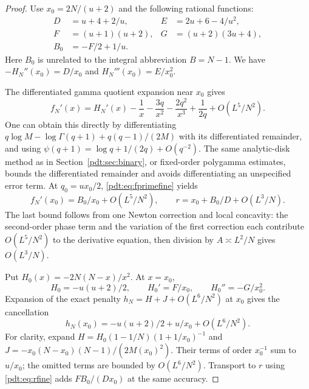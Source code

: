 \begin{proof}
Use $x_0=2N/(u+2)$ and the following rational functions:
\begin{equation}\label{pdt:eq:algebra-abbr}
 \begin{aligned}
 D&=u+4+2/u,& E&=2u+6-4/u^2,\\
 F&=(u+1)(u+2),& G&=(u+2)(3u+4),\\
 B_0&=-F/2+1/u.&
 \end{aligned}
\end{equation}
Here $B_0$ is unrelated to the integral abbreviation $B=N-1$. We have $-H_N''(x_0)=D/x_0$ and $H_N'''(x_0)=E/x_0^2$.

The differentiated gamma quotient expansion near $x_0$ gives
\begin{equation}\label{pdt:eq:fprimefine}
 f_N'(x)=H_N'(x)-\frac1x-\frac{3q}{x^2}-\frac{2q^2}{x^3}
                          +\frac1{2q}+O(L^5/N^2).
\end{equation}
One can obtain this directly by differentiating
$q\log M-\log\Gamma(q+1)+q(q-1)/(2M)$ with its differentiated remainder, and using $\psi(q+1)=\log q+1/(2q)+O(q^{-2})$. The same analytic-disk method as in Section~\ref{pdt:sec:binary}, or fixed-order polygamma estimates, bounds the differentiated remainder and avoids differentiating an unspecified error term.
At $q_0=ux_0/2$, \eqref{pdt:eq:fprimefine} yields
\begin{equation}\label{pdt:eq:rfine}
 f_N'(x_0)=B_0/x_0+O(L^5/N^2),\qquad
 r=x_0+B_0/D+O(L^3/N).
\end{equation}
The last bound follows from one Newton correction and local concavity: the second-order phase term and the variation of the first correction each contribute $O(L^5/N^2)$ to the derivative equation, then division by $A\asymp L^2/N$ gives $O(L^3/N)$.

Put $H_0(x)=-2N(N-x)/x^2$. At $x=x_0$,
\begin{equation}\label{pdt:eq:H0values}
 H_0=-u(u+2)/2,\qquad H_0'=F/x_0,\qquad H_0''=-G/x_0^2.
\end{equation}
Expansion of the exact penalty $h_N=H+J+O(L^6/N^2)$ at $x_0$ gives the cancellation
\begin{equation}\label{pdt:eq:h0cancel}
 h_N(x_0)=-u(u+2)/2+u/x_0+O(L^6/N^2).
\end{equation}
For clarity, expand $H=H_0(1-1/N)(1+1/x_0)^{-1}$ and
$J=-x_0(N-x_0)(N-1)/(2M(x_0)^2)$. Their terms of order $x_0^{-1}$ sum to $u/x_0$; the omitted terms are bounded by $O(L^6/N^2)$. Transport to $r$ using \eqref{pdt:eq:rfine} adds $FB_0/(Dx_0)$ at the same accuracy.


\end{proof}
